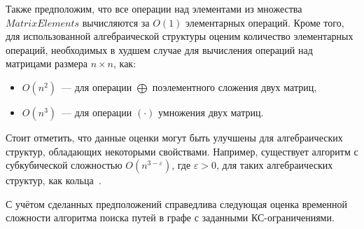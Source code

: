 Также предположим, что все операции над элементами из множества $\textit{MatrixElements}$ вычисляются за $O(1)$ элементарных операций. Кроме того, для использованной алгебраической структуры оценим количество элементарных операций, необходимых в худшем случае для вычисления операций над матрицами размера $n \times n$, как:

\begin{itemize}
    \item $O(n^2)$~--- для операции $\bigoplus$ поэлементного сложения двух матриц,
    \item $O(n^3)$~--- для операции $(\cdot)$ умножения двух матриц.
\end{itemize}

Стоит отметить, что данные оценки могут быть улучшены для алгебраических структур, обладающих некоторыми свойствами. Например, существует алгоритм с субкубической сложностью $O(n^{3 - \varepsilon})$, где $\varepsilon > 0$, для таких алгебраических структур, как кольца~\cite{strassen1969gaussian}.

С учётом сделанных предположений справедлива следующая оценка временной сложности алгоритма поиска путей в графе с заданными КС-ограничениями.

